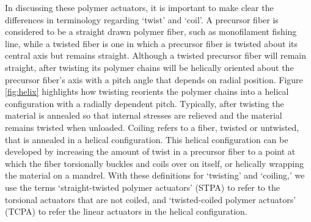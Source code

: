 \documentclass[twocolumn,10pt]{asme2e}
\begin{document}
In discussing these polymer actuators, it is important to make clear the differences in terminology regarding `twist' and `coil'. A precursor fiber is considered to be a straight drawn polymer fiber, such as monofilament fishing line, while a twisted fiber is one in which a precursor fiber is twisted about its central axis but remains straight. Although a twisted precursor fiber will remain straight, after twisting its polymer chains will be helically oriented about the precursor fiber's axis with a pitch angle that depends on radial position. Figure \ref{fig:helix} highlights how twisting reorients the polymer chains into a helical configuration with a radially dependent pitch. Typically, after twisting the material is annealed so that internal stresses are relieved and the material remains twisted when unloaded. Coiling refers to a fiber, twisted or untwisted, that is annealed in a helical configuration. This helical configuration can be developed by increasing the amount of twist in a precursor fiber to a point at which the fiber torsionally buckles and coils over on itself, or helically wrapping the material on a mandrel. With these definitions for `twisting' and `coiling,' we use the terms `straight-twisted polymer actuators' (STPA) to refer to the torsional actuators that are not coiled, and `twisted-coiled polymer actuators' (TCPA) to refer the linear actuators in the helical configuration. 
\end{document}
